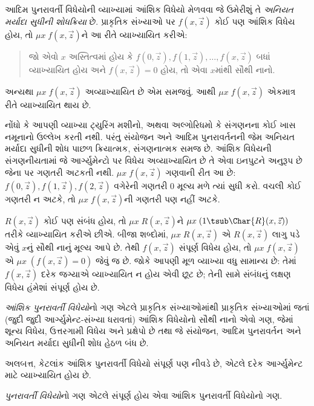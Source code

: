આદિમ પુનરાવર્તી વિધેયોની વ્યાખ્યામાં આંશિક વિધેયો મેળવવા જે
ઉમેરીશું તે \emph{અનિયત મર્યાદા સુધીની શોધક્રિયા} છે. પ્રાકૃતિક
સંખ્યાઓ પર $f(x,\vec z)$ કોઈ પણ આંશિક વિધેય હોય, તો
$\mu x \; f(x,\vec z)$ને આ રીતે વ્યાખ્યાયિત કરીએ:
\begin{quote}
  જો એવો $x$ અસ્તિત્વમાં હોય કે $f(0,\vec z), f(1,\vec z),
  \dots, f(x,\vec
  z)$ બધાં વ્યાખ્યાયિત હોય અને $f(x,\vec z) = 0$ હોય, તો એવા
  $x$માંથી સૌથી નાનો.
\end{quote}
અન્યથા $\mu x \; f(x,\vec z)$ અવ્યાખ્યાયિત છે એમ સમજવું.
આથી $\mu x \; f(x,\vec z)$ એકમાત્ર રીતે વ્યાખ્યાયિત થાય છે.

\begin{explain}
નોંધો કે આપણી વ્યાખ્યા ટ્યુરિંગ મશીનો, અથવા
અલ્ગોરિધમો કે સંગણનના કોઈ ખાસ નમૂનાનો ઉલ્લેખ કરતી નથી. પરંતુ
સંયોજન અને આદિમ પુનરાવર્તનની જેમ અનિયત મર્યાદા સુધીની શોધ પાછળ
ક્રિયાત્મક, સંગણનાત્મક સમજ છે. આંશિક વિધેયની સંગણનીયતામાં જે
આર્ગ્યુમેન્ટો પર વિધેય અવ્યાખ્યાયિત છે તે એવા ઇનપુટને અનુરૂપ છે
જેના પર ગણતરી અટકતી નથી. $\mu x \;
f(x,\vec z)$ ગણવાની રીત આ છે: $f(0,\vec z), f(1,\vec z),
f(2,\vec z)$ વગેરેની ગણતરી 0 મૂલ્ય મળે ત્યાં સુધી કરો.
વચલી કોઈ ગણતરી ન અટકે, તો $\mu x \; f(x,\vec z)$ની ગણતરી પણ
નહીં અટકે.
\end{explain}

$R(x,\vec z)$ કોઈ પણ સંબંધ હોય, તો $\mu x \; R(x,\vec z)$ને
$\mu x \; (1 \tsub \Char{R}(x,\vec z))$ તરીકે વ્યાખ્યાયિત
કરીએ છીએ. બીજા શબ્દોમાં, $\mu x \; R(x,\vec z)$ એ $R(x,\vec z)$
લાગુ પડે એવું $x$નું સૌથી નાનું મૂલ્ય આપે છે. તેથી $f(x,\vec z)$
સંપૂર્ણ વિધેય હોય, તો $\mu x \; f(x,\vec
z)$ એ $\mu x \; (f(x,\vec z) = 0)$ જેવું જ છે. જોકે આપણી
મૂળ વ્યાખ્યા વધુ સામાન્ય છે: તેમાં $f(x,\vec z)$ દરેક જગ્યાએ
વ્યાખ્યાયિત ન હોય એવી છૂટ છે; તેની સામે સંબંધનું લક્ષણ વિધેય
હંમેશાં સંપૂર્ણ હોય છે.

\begin{defn}
\emph{આંશિક પુનરાવર્તી વિધેયો}નો ગણ એટલે પ્રાકૃતિક સંખ્યાઓમાંથી
પ્રાકૃતિક સંખ્યાઓમાં જતાં (જુદી જુદી આર્ગ્યુમેન્ટ-સંખ્યા ધરાવતાં)
આંશિક વિધેયોનો સૌથી નાનો એવો ગણ, જેમાં શૂન્ય વિધેય,
ઉત્તરગામી વિધેય અને પ્રક્ષેપો છે તથા જે સંયોજન, આદિમ પુનરાવર્તન
અને અનિયત મર્યાદા સુધીની શોધ હેઠળ બંધ છે.
\end{defn}

અલબત્ત, કેટલાંક આંશિક પુનરાવર્તી વિધેયો સંપૂર્ણ પણ નીવડે છે,
એટલે દરેક આર્ગ્યુમેન્ટ માટે વ્યાખ્યાયિત હોય છે.

\begin{defn}
\emph{પુનરાવર્તી વિધેયો}નો ગણ એટલે સંપૂર્ણ હોય એવા આંશિક
પુનરાવર્તી વિધેયોનો ગણ.
\end{defn}

